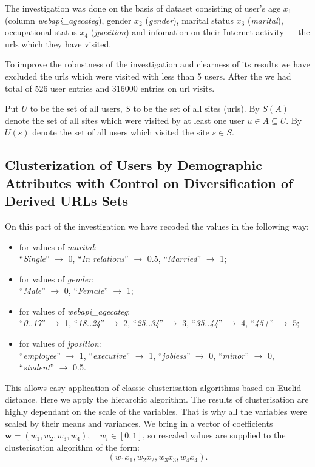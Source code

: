 \documentclass[runningheads,a4paper]{llncs}
\begin{document}
The investigation was done on the basis of dataset consisting of user's age $x_1$ (column \textit{webapi\_agecateg}), gender $x_2$ (\textit{gender}), marital status $x_3$ (\textit{marital}), occupational status $x_4$ (\textit{jposition}) and infomation on their Internet activity --- the urls which they have visited. 

To improve the robustness of the investigation and clearness of its results we have excluded the urls which were visited with less than 5 users. After the we had total of 526 user entries and 316000 entries on url visits.

Put $U$ to be the set of all users, $S$ to be the set of all sites (urls). By $S(A)$ denote the set of all sites which were visited by at least one user $u \in A \subseteq U$. By $U(s)$ denote the set of all users which visited the site $s \in S$.



\subsection{Clusterization of Users by Demographic Attributes with Control on Diversification of Derived URLs Sets}



On this part of the investigation we have recoded the values in the following way:
\begin{itemize}
\item for values of \textit{marital}: \\ 
	``\textit{Single}''  $\to$ 0,  \quad  ``\textit{In relations}''  $\to$ 0.5, \quad  ``\textit{Married}''  $\to$ 1;
\item for values of \textit{gender}: \\ 
	``\textit{Male}''  $\to$ 0, \quad  ``\textit{Female}'' $\to$ 1;
\item for values of \textit{webapi\_agecateg}: \\ 
	``\textit{0..17}''  $\to$ 1, \quad  ``\textit{18..24}''  $\to$ 2, \quad     ``\textit{25..34}''  $\to$ 3, \quad  ``\textit{35..44}''  $\to$ 4, \quad     ``\textit{45+}''  $\to$ 5;
\item for values of \textit{jposition}: \\ 
	``\textit{employee}'' $\to$ 1, \quad  ``\textit{executive}'' $\to$ 1, \quad  ``\textit{jobless}'' $\to$ 0, \quad  ``\textit{minor}'' $\to$ 0, \quad  ``\textit{student}'' $\to$ 0.5.
\end{itemize}

This allows easy application of classic clusterisation algorithms based on Euclid distance. Here we apply the hierarchic algorithm. The results of clusterisation are highly dependant on the scale of the variables. That is why all the variables were scaled by their means and variances. We bring in a vector of coefficients $\boldsymbol{w} = (w_1, w_2, w_3, w_4), \quad w_i \in [0, 1]$, so rescaled values are supplied to the clusterisation algorithm of the form:
\[
	(w_1 x_1, w_2 x_2, w_3 x_3, w_4 x_4).
\]
\end{document}
